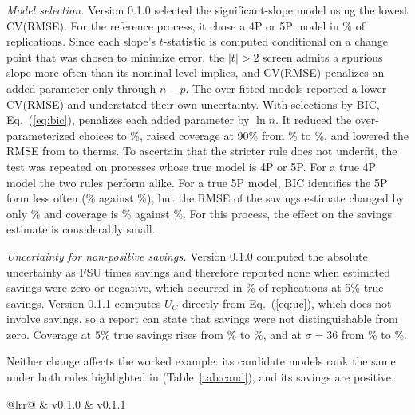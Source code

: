 \emph{Model selection.} Version 0.1.0 selected the significant-slope model using the lowest CV(RMSE). For the reference process, it chose a 4P or 5P model in \BeforeNonThree\% of replications. Since each slope's $t$-statistic is computed conditional on a change point that was chosen to minimize error, the $|t|>2$ screen admits a spurious slope more often than its nominal level implies, and CV(RMSE) penalizes an added parameter only through $n-p$. The over-fitted models reported a lower CV(RMSE) and understated their own uncertainty. With selections by BIC, Eq.~(\ref{eq:bic}), penalizes each added parameter by $\ln n$. It reduced the over-parameterized choices to \AfterNonThree\%, raised coverage at 90\% from \BeforeCovNinety\% to \McCovNinety\%, and lowered the RMSE from \BeforeRmse{} to \McRmse{} therms. To ascertain that the stricter rule does not underfit, the test was repeated on processes whose true model is 4P or 5P. For a true 4P model the two rules perform alike. For a true 5P model, BIC identifies the 5P form less often (\UfFivePAfter\% against \UfFivePBefore\%), but the RMSE of the savings estimate changed by only \UfFivePRmseChange\% and coverage is \UfFivePCovAfter\% against \UfFivePCovBefore\%. For this process, the effect on the savings estimate is considerably small.

\emph{Uncertainty for non-positive savings.} Version 0.1.0 computed the absolute uncertainty as FSU times savings and therefore reported none when estimated savings were zero or negative, which occurred in \BeforeUndefFive\% of replications at 5\% true savings. Version 0.1.1 computes $U_C$ directly from Eq.~(\ref{eq:uc}), which does not involve savings, so a report can state that savings were not distinguishable from zero. Coverage at 5\% true savings rises from \BeforeCovFive\% to \CovFrFive\%, and at $\sigma=36$ from \BeforeCovNoise\% to \CovNoiseThirtySix\%.

Neither change affects the worked example: its candidate models rank the same under both rules highlighted in (Table~\ref{tab:cand}), and its savings are positive.

\begin{table}[t]
\caption{Option C results based on identical synthetic data under versions 0.1.0 and 0.1.1. The reference process has a true 3PH model ($F_{\rm true}=15\%$, $\sigma=12$ therms/day, 24-month baseline, \McReps{} replications); the weak and noisy rows use \ScanReps{} replications each.}
\label{tab:changes}
\centering\small
\begin{tabular}{@{}lrr@{}}
\toprule
 & v0.1.0 & v0.1.1 \\
\midrule
{} \\
\BeforeAfterRows
\bottomrule
\end{tabular}
\end{table}

